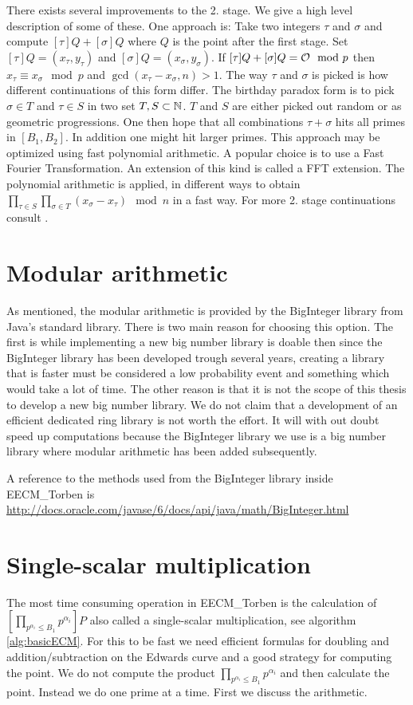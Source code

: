 There exists several improvements to the 2. stage. We give a high level description of some of these. One approach is: Take two integers $\tau$ and $\sigma$ and compute $[\tau] Q+[\sigma] Q$ where $Q$ is the point after the first stage. Set $[\tau]Q=(x_\tau,y_\tau)$ and $[\sigma]Q=(x_\sigma,y_\sigma)$. If $[\tau] Q+[\sigma] Q=\mathcal{O} \mod p$ then $x_\tau \equiv x_\sigma \mod p$ and $\gcd(x_\tau-x_\sigma,n)>1$. The way $\tau$ and $\sigma$ is picked is how different continuations of this form differ. The birthday paradox form is to pick $\sigma\in T$ and $\tau\in S$ in two set $T,S\subset\mathbb{N}$. $T$ and $S$ are either picked out random or as geometric progressions. One then hope that all combinations $\tau+\sigma$ hits all primes in $[B_1,B_2]$. In addition one might hit larger primes. This approach may be optimized using fast polynomial arithmetic. A popular choice is to use a Fast Fourier Transformation. An extension of this kind is called a FFT extension. The polynomial arithmetic is applied, in different ways to obtain $\prod_{\tau\in S}\prod_{\sigma\in T}(x_\sigma-x_\tau)\mod n$ in a fast way. For more 2. stage continuations consult \cite{ZimmermannD06}.

\section{Modular arithmetic}\label{sec:modularArithmetic}
As mentioned, the modular arithmetic is provided by the BigInteger library from Java's standard library. There is two main reason for choosing this option. The first is while implementing a new big number library is doable then since the BigInteger library has been developed trough several years, creating a library that is faster must be considered a low probability event and something which would take a lot of time. The other reason is that it is not the scope of this thesis to develop a new big number library. We do not claim that a development of an efficient dedicated ring library is not worth the effort. It will with out doubt speed up computations because the BigInteger library we use is a big number library where modular arithmetic has been added subsequently. 

A reference to the methods used from the BigInteger library inside EECM\_Torben is \url{http://docs.oracle.com/javase/6/docs/api/java/math/BigInteger.html}

\section{Single-scalar multiplication}\label{sec:SSM}
The most time consuming operation in EECM\_Torben is the calculation of $\left[\prod_{p^{\alpha_i}\leq B_1} p^{\alpha_i}\right]P$ also called a single-scalar multiplication, see algorithm \ref{alg:basicECM}. For this to be fast we need efficient formulas for doubling and addition/subtraction on the Edwards curve and a good strategy for computing the point. We do not compute the product $\prod_{p^{\alpha_i}\leq B_1} p^{\alpha_i}$ and then calculate the point. Instead we do one prime at a time. First we discuss the arithmetic.

